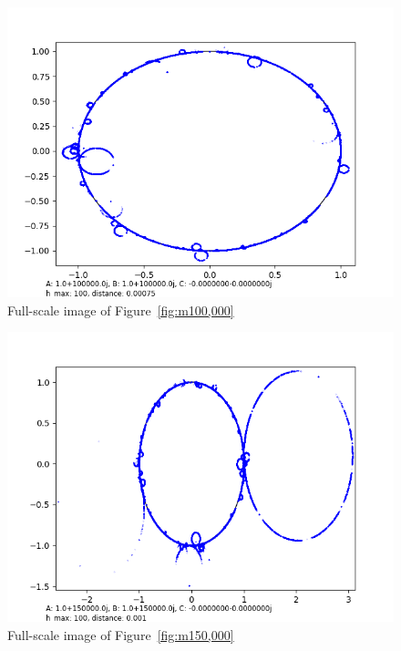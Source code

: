 \documentclass[12pt,a4paper,reqno,parskip=full]{amsart}
\numberwithin{equation}{section}
\theoremstyle{plain}
\theoremstyle{definition}
\begin{document}
\begin{figure}[H]
    \centering
    \includegraphics[width=\textwidth]{images/m/a100,000,b100,000,h100,d.00075.png}
    \caption{Full-scale image of Figure~\ref{fig:m100,000}}
\end{figure}

\begin{figure}[H]
    \centering
    \includegraphics[width=\textwidth]{images/m/a150,000,b150,000,h100,d.0010.png}
    \caption{Full-scale image of Figure~\ref{fig:m150,000}}
\end{figure}
\end{document}
